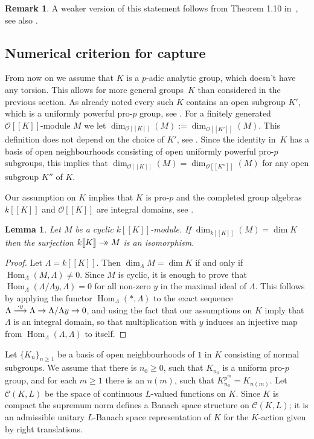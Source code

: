 \documentclass[JEP,XML,SOM,Unicode,NoEqCountersInSection]{cedram}
\let\mathcal\mathscr
\newcommand{\To}[1]{\mathchoice{\xrightarrow{\textstyle\kern4pt#1\kern3pt}}{\stackrel{#1}{\longrightarrow}}{}{}}
\newcommand{\onto}{\mathchoice{\to\hspace*{-5mm}\to}{\to\hspace*{-2.85mm}\to}{\to\hspace*{-3mm}\to}{\to\hspace*{-3mm}\to}}
\newtheorem{lem}[prop]{Lemma}
\theoremstyle{definition}
\newtheorem{remark}[prop]{Remark}
\DeclareMathOperator{\Hom}{Hom}
\newcommand{\br}[1]{[\![#1]\!]}
\newcommand{\cO}{\mathcal{O}}
\begin{document}
\begin{remark} A weaker version of this statement follows from Theorem 1.10 in~\cite{harris}, see also \cite{harris_err}.
\end{remark}

\subsection{Numerical criterion for capture} From now on we assume that $K$ is
a $p$-adic analytic group, which doesn't have any torsion. This allows for
more general groups~$K$ than considered in the previous section. As already
noted every such $K$ contains an open subgroup $K'$, which is a uniformly
powerful pro-$p$ group, see \cite[Th.\,8.23]{analytic}. For a finitely
generated $\cO\br{K}$-module $M$ we let $\dim_{\cO\br{K}}(M):=
\dim_{\cO\br{K'}}(M)$. This definition does not depend on the choice of $K'$,
see \cite[\S 5.4]{ardakov_brown}. Since the identity in~$K$ has a basis of open
neighbourhoods consisting of open uniformly powerful pro-$p$ subgroups, this
implies that $\dim_{\cO\br{K}}(M)= \dim_{\cO\br{K''}}(M)$ for any open subgroup
$K''$ of $K$.

Our assumption on $K$ implies that $K$ is pro-$p$ and the completed group
algebras $k\br{K}$ and $\cO\br{K}$ are integral domains, see
\cite[Th.\,4.3]{ardakov_brown}.

\begin{lem}\label{dim_cyclic} Let $M$ be a cyclic $k\br{K}$-module. If
$\dim_{k\br{K}}(M)= \dim K$ then the surjection $k\br{K}\onto M$
is an isomorphism. \end{lem} 
\begin{proof} Let $\Lambda=k \br{K}$. Then
$\dim_{\Lambda} M = \dim K$ if and only if $\Hom_{\Lambda}(M, \Lambda)\neq 0$.
Since $M$ is cyclic, it is enough to prove that $\Hom_{\Lambda}(\Lambda/
\Lambda y, \Lambda)=0$ for all non-zero $y$ in the maximal ideal of $\Lambda$.
This follows by applying the functor $\Hom_{\Lambda}(\ast, \Lambda)$ to the
exact sequence $\Lambda \To{\cdot y} \Lambda\to
\Lambda/\Lambda y\to 0$, and using the fact that our assumptions on $K$
imply that $\Lambda$ is an integral domain, so that multiplication with $y$
induces an injective map from $\Hom_{\Lambda}(\Lambda, \Lambda)$ to itself.
\end{proof}

Let $\{K_n\}_{n\ge 1}$ be a basis of open neighbourhoods of $1$ in $K$
consisting of normal subgroups. We assume that there is $n_0\ge 0$, such that
$K_{n_0}$ is a uniform pro-$p$ group, and for each $m\ge 1$ there is an $n(m)$,
such that $K_{n_0}^{p^m}= K_{n(m)} $. Let $\mathcal C(K, L)$ be the space of
continuous $L$-valued functions on $K$. Since $K$ is compact the supremum norm
defines a Banach space structure on $\mathcal C(K, L)$; it is an admissible
unitary $L$-Banach space representation of $K$ for the $K$-action given by
right translations.
\end{document}
